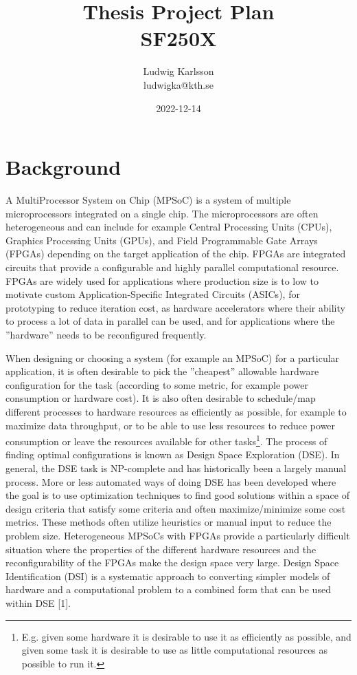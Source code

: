 \documentclass[12pt,notitlepage]{article}
\title{Thesis Project Plan\\SF250X}
\author{Ludwig Karlsson\\ludwigka@kth.se}
\date{2022-12-14}
\begin{document}
\maketitle

\section{Background}
A MultiProcessor System on Chip (MPSoC) is a system of multiple microprocessors integrated on a single chip. The microprocessors are often heterogeneous and can include for example Central Processing Units (CPUs), Graphics Processing Units (GPUs), and Field Programmable Gate Arrays (FPGAs) depending on the target application of the chip. FPGAs are integrated circuits that provide a configurable and highly parallel computational resource. FPGAs are widely used for applications where production size is to low to motivate custom Application-Specific Integrated Circuits (ASICs), for prototyping to reduce iteration cost, as hardware accelerators where their ability to process a lot of data in parallel can be used, and for applications where the ''hardware'' needs to be reconfigured frequently.

When designing or choosing a system (for example an MPSoC) for a particular application, it is often desirable to pick the ''cheapest'' allowable hardware configuration for the task (according to some metric, for example power consumption or hardware cost). It is also often desirable to schedule/map different processes to hardware resources as efficiently as possible, for example to maximize data throughput, or to be able to use less resources to reduce power consumption or leave the resources available for other tasks\footnote{E.g. given some hardware it is desirable to use it as efficiently as possible, and given some task it is desirable to use as little computational resources as possible to run it.}. The process of finding optimal configurations is known as Design Space Exploration (DSE). In general, the DSE task is NP-complete and has historically been a largely manual process. More or less automated ways of doing DSE has been developed where the goal is to use optimization techniques to find good solutions within a space of design criteria that satisfy some criteria and often maximize/minimize some cost metrics. These methods often utilize heuristics or manual input to reduce the problem size. Heterogeneous MPSoCs with FPGAs provide a particularly difficult situation where the properties of the different hardware resources and the reconfigurability of the FPGAs make the design space very large. Design Space Identification (DSI) is a systematic approach to converting simpler models of hardware and a computational problem to a combined form that can be used within DSE [1].
\end{document}
